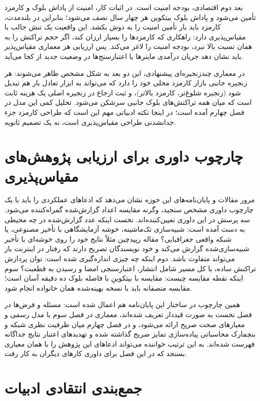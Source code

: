بعد دوم اقتصادی، بودجه امنیت است. در اثبات کار، امنیت از پاداش بلوک و کارمزد تأمین می‌شود و پاداش بلوک بیتکوین هر چهار سال نصف می‌شود؛ بنابراین در بلندمدت، کارمزد باید بار تأمین امنیت را به دوش بکشد. این واقعیت یک تنش جالب با مقیاس‌پذیری دارد: راهکاری که کارمزدها را بسیار ارزان کند، اگر حجم تراکنش را به همان نسبت بالا نبرد، بودجه امنیت را لاغر می‌کند. پس ارزیابی هر معماری مقیاس‌پذیر باید نشان دهد جریان درآمدی ماینرها یا اعتبارسنج‌ها در وضعیت جدید از کجا می‌آید.

در معماری چندزنجیره‌ای پیشنهادی، این دو بعد به شکل مشخص ظاهر می‌شوند: هر زنجیره جانبی بازار کارمزد محلی خود را دارد که می‌تواند به ابزار تعادل بار هم تبدیل شود (زنجیره شلوغ‌تر، کارمزد بالاتر)، و ثبت ارجاع در زنجیره اصلی یک هزینه ثابت است که میان همه تراکنش‌های بلوک جانبی سرشکن می‌شود. تحلیل کمی این مدل در فصل چهارم آمده است؛ در اینجا نکته ادبیاتی مهم این است که طراحی کارمزد جزء جدانشدنی طراحی مقیاس‌پذیری است، نه یک تصمیم ثانویه.

\section{چارچوب داوری برای ارزیابی پژوهش‌های مقیاس‌پذیری}

مرور مقالات و پایان‌نامه‌های این حوزه نشان می‌دهد که ادعاهای عملکردی را باید با یک چارچوب داوری مشخص سنجید، وگرنه مقایسه اعداد گزارش‌شده گمراه‌کننده می‌شود. سه پرسش در این داوری تعیین‌کننده‌اند. نخست اینکه عدد گزارش‌شده در چه محیطی به دست آمده است: شبیه‌سازی تک‌ماشینه، خوشه آزمایشگاهی با تأخیر مصنوعی، یا شبکه واقعی جغرافیایی؟ مقاله رپیدچین مثلاً نتایج خود را روی خوشه‌ای با تأخیر شبیه‌سازی‌شده گزارش می‌کند و خود نویسندگان تصریح دارند که رفتار در اینترنت باز می‌تواند متفاوت باشد. دوم اینکه چه چیزی اندازه‌گیری شده است: توان پردازش تراکنش ساده، یا کل مسیر شامل انتشار، اعتبارسنجی امضا و رسیدن به قطعیت؟ سوم اینکه نقطه مقایسه چیست: مقایسه با بیتکوینِ با فاصله بلوک ده دقیقه آسان است؛ مقایسه منصفانه باید با نسخه بهینه‌شده همان خانواده انجام شود.

همین چارچوب در ساختار این پایان‌نامه هم اعمال شده است: مسئله و فرض‌ها در فصل نخست به صورت قیددار تعریف شده‌اند، معماری در فصل سوم با مدل رسمی و معیارهای صحت صریح ارائه می‌شود، و در فصل چهارم میان ظرفیت نظری شبکه و بنچمارک محاسباتی پیاده‌سازی تمایز صریح گذاشته شده و تهدیدهای اعتبار نتایج جداگانه فهرست شده‌اند. به این ترتیب خواننده می‌تواند ادعاهای این پژوهش را با همان معیاری بسنجد که در این فصل برای داوری کارهای دیگران به کار رفت.

\section{جمع‌بندی انتقادی ادبیات}

